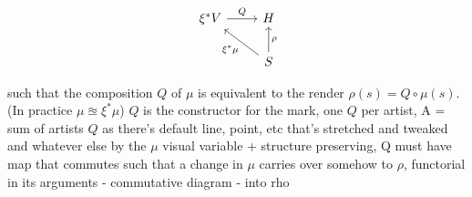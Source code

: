\documentclass[../main.tex]{subfiles}
\begin{document}
\begin{equation}
    \begin{tikzcd}
        \xi^*V \arrow[r, "Q"] & H                                           \\
                              & S \arrow[lu, "\xi^*\mu"] \arrow[u, "\rho"']
    \end{tikzcd}
\end{equation}

such that the composition $Q$ of $\mu$ is equivalent to the render $\rho(s) = Q\circ\mu(s)$. 
(In practice $\mu \approxeq \xi^*\mu$)
$Q$ is the constructor for the mark, 
one $Q$ per artist, A = sum of artists
$Q$ as there's default line, point, etc that's stretched and tweaked and whatever else by the $\mu$
visual variable + structure preserving, Q must have map that commutes such that a change in $\mu$ carries over somehow to $\rho$, functorial in its arguments - commutative diagram - into rho
\end{document}
